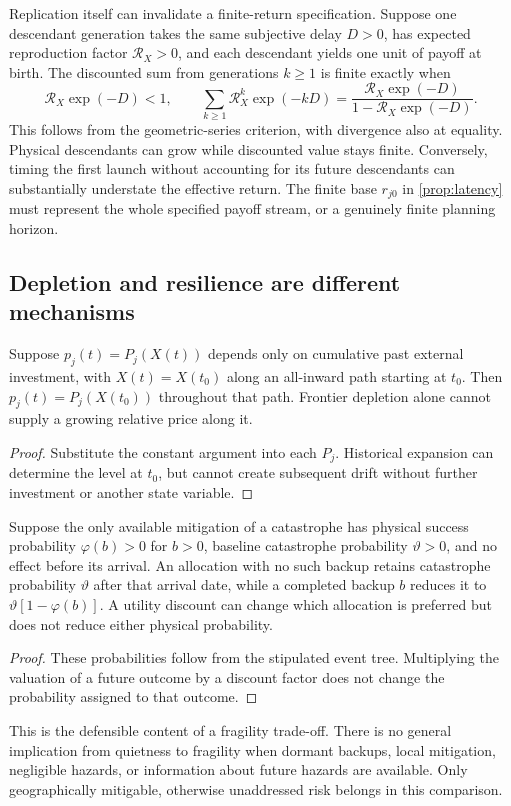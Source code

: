 Replication itself can invalidate a finite-return specification. Suppose
one descendant generation takes the same subjective delay $D>0$, has
expected reproduction factor $\mathcal R_X>0$, and each descendant yields
one unit of payoff at birth. The discounted sum from generations
$k\geq1$ is finite exactly when
\begin{equation}
 \mathcal R_X\exp(-D)<1,
 \qquad \sum_{k\geq1}\mathcal R_X^k\exp(-kD)
       =\frac{\mathcal R_X\exp(-D)}{1-\mathcal R_X\exp(-D)}.
 \label{eq:discounted-replication}
\end{equation}
This follows from the geometric-series criterion, with divergence also
at equality. Physical descendants can grow while discounted value stays
finite. Conversely, timing the first launch without accounting for its
future descendants can substantially understate the effective return.
The finite base $r_{j0}$ in \cref{prop:latency} must represent the whole
specified payoff stream, or a genuinely finite planning horizon.

\subsection{Depletion and resilience are different mechanisms}
\begin{proposition}
\label{prop:depletion}
Suppose $p_j(t)=P_j(X(t))$ depends only on cumulative past external
investment, with $X(t)=X(t_0)$ along an all-inward path starting at $t_0$.
Then $p_j(t)=P_j(X(t_0))$ throughout that path. Frontier depletion alone
cannot supply a growing relative price along it.
\end{proposition}
\begin{proof}
Substitute the constant argument into each $P_j$. Historical expansion
can determine the level at $t_0$, but cannot create subsequent drift
without further investment or another state variable.
\end{proof}

\begin{corollary}
\label{cor:quiet-risk}
Suppose the only available mitigation of a catastrophe has physical
success probability $\varphi(b)>0$ for $b>0$, baseline catastrophe
probability $\vartheta>0$, and no effect before its arrival. An allocation
with no such backup retains catastrophe probability $\vartheta$ after
that arrival date, while a completed backup $b$ reduces it to
$\vartheta[1-\varphi(b)]$. A utility discount can change which allocation
is preferred but does not reduce either physical probability.
\end{corollary}
\begin{proof}
These probabilities follow from the stipulated event tree. Multiplying
the valuation of a future outcome by a discount factor does not change
the probability assigned to that outcome.
\end{proof}
This is the defensible content of a fragility trade-off. There is no
general implication from quietness to fragility when dormant backups,
local mitigation, negligible hazards, or information about future hazards
are available. Only geographically mitigable, otherwise unaddressed risk
belongs in this comparison.

